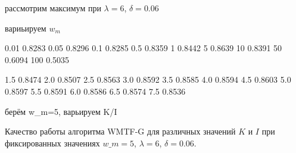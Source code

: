     рассмотрим максимум при $\lambda=6$, $\delta=0.06$

    вариьируем $w_m$

    0.01 0.8283
    0.05 0.8296
    0.1 0.8285
    0.5 0.8359
    1 0.8442
    5 0.8639
    10 0.8391
    50 0.6094
    100 0.5035

    1.5 0.8474
    2.0 0.8507
    2.5 0.8563
    3.0 0.8592
    3.5 0.8585
    4.0 0.8594
    4.5 0.8603
    5.0 0.8597
    5.5 0.8591
    6.0 0.8586
    6.5 0.8574
    7.5 0.8536

    берём w\_m=5, варьируем K/I

    \begin{table}[ht!]
        \caption{Качество работы алгоритма WMTF-G для различных значений $K$ и $I$ при фиксированных значениях $w\_m=5$, $\lambda=6$, $\delta=0.06$. \bigskip}
        \centering


\end{table}
